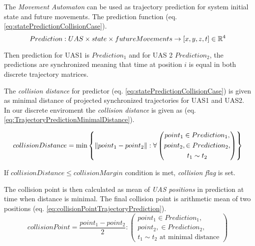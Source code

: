 The \emph{Movement Automaton} can be used as trajectory prediction for system initial state and future movements.  The prediction function (eq. \ref{eq:statePredictionCollisionCase}).
\begin{equation}\label{eq:statePredictionCollisionCase}
    Prediction: UAS \times state \times future Movements \to [x,y,z,t] \in \mathbb{R}^4
\end{equation}

\begin{note}
    Then prediction for UAS1 is $Prediction_1$ and for UAS 2 $Prediction_2$, the predictions are synchronized meaning that time at position $i$ is equal in both discrete trajectory matrices.
\end{note}

\noindent The \emph{collision distance} for predictor (eq. \ref{eq:statePredictionCollisionCase}) is given as minimal distance of projected synchronized trajectories for UAS1 and UAS2. In our discrete enviroment the \emph{collision distance} is given as (eq. \ref{eq:TrajectoryPredictionMinimalDistance}).

\begin{equation}\label{eq:TrajectoryPredictionMinimalDistance}
    collisionDistance = \text{min}\left\{\left\lVert point_1-point_2\right\rVert:\forall \left(\begin{gathered}point_1 \in Prediction_1,\\ point_2, \in Prediction_2,\\ t_1 \sim t_2 \end{gathered}\right)\right\} 
\end{equation}

If $collisionDistance \le collision Margin$  condition is met, \emph{collision flag} is set.  

The collision point is then calculated  as mean of \emph{UAS positions} in prediction at time when distance is minimal.  The final collision point is arithmetic mean of two positions (eq. \ref{eq:collisionPointTrajectoryPrediction}).
\begin{equation}\label{eq:collisionPointTrajectoryPrediction}
    collisionPoint= \frac{point_1 - point_2}{2}:\left(\begin{gathered}point_1 \in Prediction_1,\\ point_2, \in Prediction_2,\\ t_1 \sim t_2 \text{ at minimal distance}\end{gathered}\right)
\end{equation}

